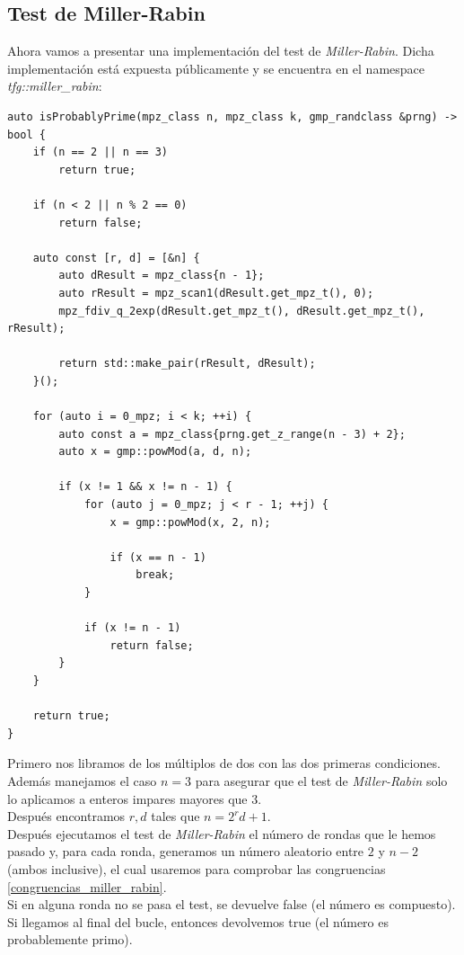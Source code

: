 \subsection{Test de Miller-Rabin}

Ahora vamos a presentar una implementación del test de \textit{Miller-Rabin}. Dicha implementación está expuesta públicamente y se encuentra en el namespace \textit{tfg::miller\_rabin}:\\

\begin{lstlisting}
auto isProbablyPrime(mpz_class n, mpz_class k, gmp_randclass &prng) -> bool {
	if (n == 2 || n == 3)
		return true;
	
	if (n < 2 || n % 2 == 0)
		return false;
	
	auto const [r, d] = [&n] {
		auto dResult = mpz_class{n - 1};
		auto rResult = mpz_scan1(dResult.get_mpz_t(), 0);
		mpz_fdiv_q_2exp(dResult.get_mpz_t(), dResult.get_mpz_t(), rResult);
		
		return std::make_pair(rResult, dResult);
	}();
	
	for (auto i = 0_mpz; i < k; ++i) {
		auto const a = mpz_class{prng.get_z_range(n - 3) + 2};
		auto x = gmp::powMod(a, d, n);
		
		if (x != 1 && x != n - 1) {
			for (auto j = 0_mpz; j < r - 1; ++j) {
				x = gmp::powMod(x, 2, n);
				
				if (x == n - 1)
					break;
			}
			
			if (x != n - 1)
				return false;
		}
	}
	
	return true;
}
\end{lstlisting}

Primero nos libramos de los múltiplos de dos con las dos primeras condiciones. Además manejamos el caso $n = 3$ para asegurar que el test de \textit{Miller-Rabin} solo lo aplicamos a enteros impares mayores que $3$.\\

Después encontramos $r, d$ tales que $n = 2^rd + 1$.\\

Después ejecutamos el test de \textit{Miller-Rabin} el número de rondas que le hemos pasado y, para cada ronda, generamos un número aleatorio entre $2$ y $n-2$ (ambos inclusive), el cual usaremos para comprobar las congruencias \eqref{congruencias_miller_rabin}.\\

Si en alguna ronda no se pasa el test, se devuelve false (el número es compuesto). Si llegamos al final del bucle, entonces devolvemos true (el número es probablemente primo).

